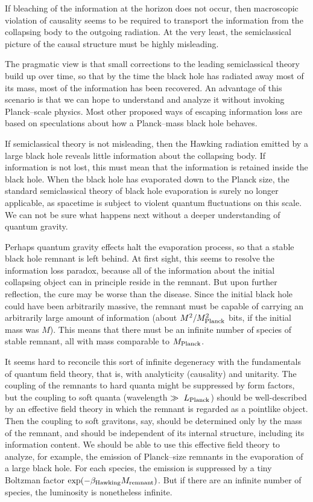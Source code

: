 If bleaching of the information at the horizon does not occur, then macroscopic
violation of causality seems to be required to transport the information from
the collapsing body to the outgoing radiation.  At the very least, the
semiclassical picture of the causal structure must be highly misleading.

\bigskip
{}
The pragmatic view is that small corrections to the leading semiclassical
theory build up over time, so that by the time the black hole has radiated away
most of its mass, most of the information has been recovered.  An advantage of
this scenario is that we can hope to understand and analyze it without invoking
Planck--scale physics.  Most other proposed ways of escaping information loss
are based on speculations about how a Planck--mass black hole behaves.

If semiclassical theory is not misleading, then the Hawking radiation emitted
by a large black hole reveals little information about the collapsing body.  If
information is not lost, this must mean that the information is retained inside
the black hole.  When the black hole has evaporated down to the Planck size,
the standard semiclassical theory of black hole evaporation is surely no longer
applicable, as spacetime is subject to violent quantum fluctuations on this
scale.  We can not be sure what happens next without a deeper understanding of
quantum gravity.

Perhaps quantum gravity effects halt the evaporation process, so that a stable
black hole remnant is left behind.  At first sight, this seems to resolve the
information loss paradox, because all of the information about the initial
collapsing object can in principle reside in the remnant.  But upon further
reflection, the cure may be worse than the disease.  Since the initial black
hole could have been arbitrarily massive, the remnant must be capable of
carrying an arbitrarily large amount of information (about $
M^2/M_{\rm Planck}^2$ bits, if the initial mass was $M$).  This means that
there must be an infinite number of species of stable remnant, all with mass
comparable to $M_{\rm Planck}$.

It seems hard to reconcile this sort of infinite degeneracy with the
fundamentals of quantum field theory, that is, with analyticity (causality) and
unitarity\hooftA.  The coupling of the remnants to hard quanta might be
suppressed by
form factors, but the coupling to soft quanta (wavelength $\gg ~L_{\rm Planck}$)
should be well-described by an effective field theory in which the remnant is
regarded as a pointlike object.  Then the coupling to soft gravitons, say,
should be determined only by the mass of the remnant, and should be independent
of its internal structure, including its information content.  We should be
able to use this effective field theory to analyze, for example, the emission
of Planck--size remnants in the evaporation of a large black hole.  For each
species, the emission is suppressed by a tiny Boltzman factor
$\exp({-\beta_{\rm Hawking}M_{\rm remnant}})$.  But if there are an infinite
number of species, the luminosity is nonetheless infinite.

